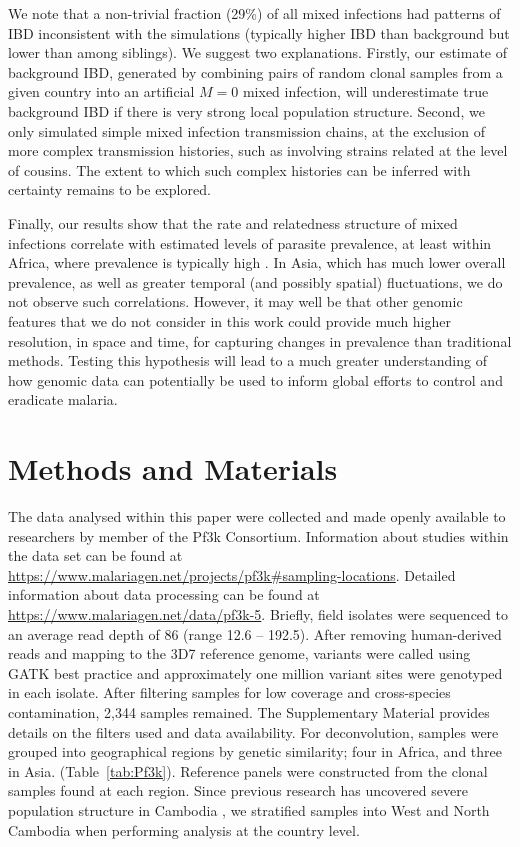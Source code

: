 \documentclass[9pt,lineno]{elife}
\begin{document}
We note that a non-trivial fraction (29\%) of all mixed infections had patterns of IBD inconsistent with the simulations (typically higher IBD than background but lower than among siblings).  We suggest two explanations.  Firstly, our estimate of background IBD, generated by combining pairs of random clonal samples from a given country into an artificial $M=0$ mixed infection, will underestimate true background IBD if there is very strong local population structure.  Second, we only simulated simple mixed infection transmission chains, at the exclusion of more complex transmission histories, such as involving strains related at the level of cousins. The extent to which such complex histories can be inferred with certainty remains to be explored.

Finally, our results show that the rate and relatedness structure of mixed infections correlate with estimated levels of parasite prevalence, at least within Africa, where prevalence is typically high \citep{SMITH199355}.  In Asia, which has much lower overall prevalence, as well as greater temporal (and possibly spatial) fluctuations, we do not observe such correlations.  However, it may well be that other genomic features that we do not consider in this work could provide much higher resolution, in space and time, for capturing changes in prevalence than traditional methods.  Testing this hypothesis will lead to a much greater understanding of how genomic data can potentially be used to inform global efforts to control and eradicate malaria.


\section{Methods and Materials}

The data analysed within this paper were collected and made openly available to researchers by member of the Pf3k Consortium.  Information about studies within the data set can be found at \url{https://www.malariagen.net/projects/pf3k#sampling-locations}.  Detailed information about data processing can be found at \url{https://www.malariagen.net/data/pf3k-5}.  Briefly, field isolates were sequenced to an average read depth of 86 (range 12.6 -- 192.5).  After removing human-derived reads and mapping to the 3D7 reference genome, variants were called using GATK best practice and approximately one million variant sites were genotyped in each isolate. After filtering samples for low coverage and cross-species contamination, 2,344 samples remained.    The Supplementary Material provides details on the filters used and data availability. For deconvolution, samples were grouped into geographical regions by genetic similarity; four in Africa, and three in Asia. (Table~\ref{tab:Pf3k}). Reference panels were constructed from the clonal samples found at each region. Since previous research has uncovered severe population structure in Cambodia \citep{Miotto2013}, we stratified samples into West and North Cambodia when performing analysis at the country level.
\end{document}

